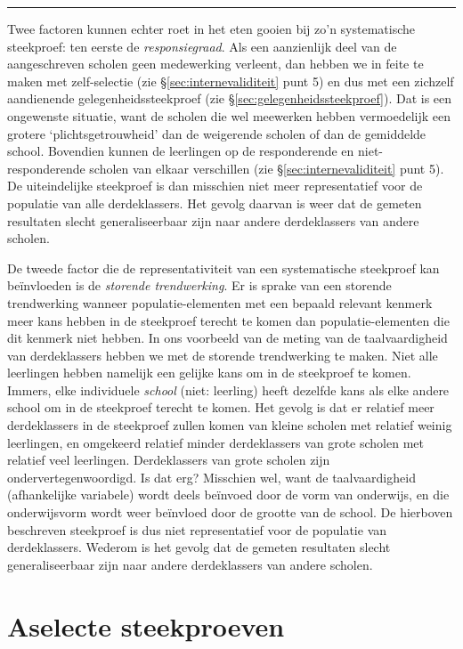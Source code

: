 \documentclass[
]{book}
\begin{document}
\begin{center}\rule{0.5\linewidth}{0.5pt}\end{center}

Twee factoren kunnen echter roet in het eten gooien bij zo'n
systematische steekproef: ten eerste de \emph{responsiegraad}. Als een
aanzienlijk deel van de aangeschreven scholen geen medewerking verleent,
dan hebben we in feite te maken met zelf-selectie (zie
§\ref{sec:internevaliditeit} punt 5)
en dus met een zichzelf aandienende
gelegenheidssteekproef (zie
§\ref{sec:gelegenheidssteekproef}). Dat is een ongewenste
situatie, want de scholen die wel meewerken hebben vermoedelijk een
grotere `plichtsgetrouwheid' dan de weigerende scholen of dan de
gemiddelde school. Bovendien kunnen de leerlingen op de responderende en
niet-responderende scholen van elkaar verschillen
(zie §\ref{sec:internevaliditeit} punt 5).
De uiteindelijke steekproef is dan
misschien niet meer representatief voor de populatie van alle
derdeklassers. Het gevolg daarvan is weer dat de gemeten resultaten
slecht generaliseerbaar zijn naar andere derdeklassers van andere
scholen.

De tweede factor die de representativiteit van een systematische
steekproef kan beïnvloeden is de \emph{storende trendwerking}. Er is sprake
van een storende trendwerking wanneer populatie-elementen met een
bepaald relevant kenmerk meer kans hebben in de steekproef terecht te
komen dan populatie-elementen die dit kenmerk niet hebben. In ons
voorbeeld van de meting van de taalvaardigheid van derdeklassers hebben
we met de storende trendwerking te maken. Niet alle leerlingen hebben
namelijk een gelijke kans om in de steekproef te komen. Immers, elke
individuele \emph{school} (niet: leerling) heeft dezelfde kans als elke
andere school om in de steekproef terecht te komen. Het gevolg is dat er
relatief meer derdeklassers in de steekproef zullen komen van kleine
scholen met relatief weinig leerlingen, en omgekeerd relatief minder
derdeklassers van grote scholen met relatief veel leerlingen.
Derdeklassers van grote scholen zijn ondervertegenwoordigd. Is dat erg?
Misschien wel, want de taalvaardigheid (afhankelijke variabele) wordt
deels beïnvoed door de vorm van onderwijs, en die onderwijsvorm wordt
weer beïnvloed door de grootte van de school. De hierboven beschreven
steekproef is dus niet representatief voor de populatie van
derdeklassers. Wederom is het gevolg dat de gemeten resultaten slecht
generaliseerbaar zijn naar andere derdeklassers van andere scholen.

\hypertarget{sec:aselectesteekproef}{%
\section{Aselecte steekproeven}\label{sec:aselectesteekproef}}
\end{document}
